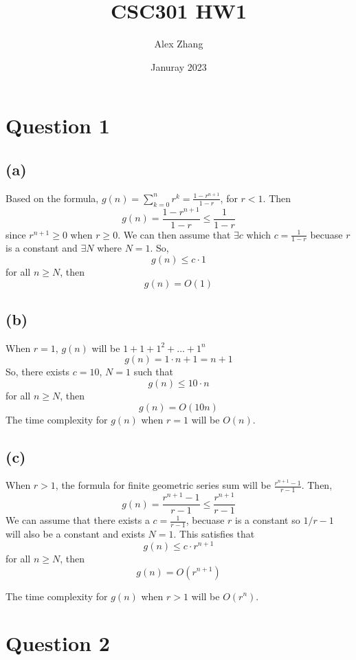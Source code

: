 \documentclass{article}
\title{CSC301 HW1}
\author{Alex Zhang}
\date{Januray 2023}
\begin{document}
\maketitle
\section{Question 1}
    \subsection{(a)}
    Based on the formula, $g(n) = \sum_{k=0}^{n} r^k = \frac{1-r^{n+1}}{1-r}$, for $r < 1$.
Then
    $$g(n) = \frac{1-r^{n+1}}{1-r} \leq \frac{1}{1-r} $$
since $r^{n+1} \geq 0$ when  $r \geq 0$.
We can then assume that $\exists c$ which $c = \frac{1}{1-r}$ becuase $r$ is a constant
and $\exists N$ where $N = 1$.
So,
$$g(n) \leq c \cdot 1$$
for all $n \geq N$, then 
$$g(n) = O(1)$$

    \subsection{(b)}
    When $r = 1$, $g(n)$ will be $1 + 1 + 1^2 + \dots  + 1^n$
$$g(n) =  1\cdot n + 1 = n + 1$$
So, there exists $c = 10$, $N = 1$ such that 
$$g(n) \leq  10 \cdot n$$
for all $n \geq N$, then 
$$g(n) = O(10n)$$
The time complexity for $g(n)$ when $r=1$ will be $O(n)$.
    \subsection{(c)}
    When $r > 1$, the formula for finite geometric series sum will be $\frac{r^{n+1}-1}{r-1}$.
Then, 
$$g(n) = \frac{r^{n+1}-1}{r-1} \leq \frac{r^{n+1}}{r-1}$$
We can assume that there exists a $c = \frac{1}{r-1}$, becuase $r$ is a constant so $1/r-1$ will also be a constant and exists $N = 1$.
This satisfies that 
$$g(n) \leq c \cdot r^{n+1}$$
for all $n \geq N$, then 
$$g(n) = O(r^{n+1})$$

The time complexity for $g(n)$ when $r > 1$ will be $O(r^n)$.



\section{Question 2}
\end{document}
